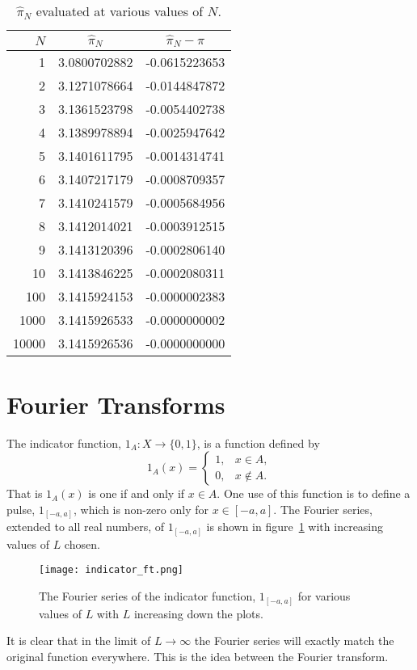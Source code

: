 \documentclass[a4paper]{article}
\begin{document}
    \begin{table}[ht]
        \centering
        \begin{tabular}{rcc}\hline
            \(N\) & \(\hat{\pi}_N\) & \(\hat{\pi}_N - \pi\)\\\hline
            1 & 3.0800702882 & -0.0615223653\\
            2 & 3.1271078664 & -0.0144847872\\
            3 & 3.1361523798 & -0.0054402738\\
            4 & 3.1389978894 & -0.0025947642\\
            5 & 3.1401611795 & -0.0014314741\\
            6 & 3.1407217179 & -0.0008709357\\
            7 & 3.1410241579 & -0.0005684956\\
            8 & 3.1412014021 & -0.0003912515\\
            9 & 3.1413120396 & -0.0002806140\\
            10 & 3.1413846225 & -0.0002080311\\
            100 & 3.1415924153 & -0.0000002383\\
            1000 & 3.1415926533 & -0.0000000002\\
            10000 & 3.1415926536 & -0.0000000000\\\hline
        \end{tabular}
        \caption{\(\hat{\pi}_N\) evaluated at various values of \(N\).}
        \label{tab:pi_N 3}
    \end{table}

    \section{Fourier Transforms}
    The indicator function, \(1_A\colon X\to \{0, 1\}\), is a function defined by
    \[
        1_A(x) = 
        \begin{cases}
            1, & x\in A,\\
            0, & x\notin A.
        \end{cases}
    \]
    That is \(1_A(x)\) is one if and only if \(x\in A\).
    One use of this function is to define a pulse, \(1_{[-a, a]}\), which is non-zero only for \(x\in[-a, a]\).
    The Fourier series, extended to all real numbers, of \(1_{[-a, a]}\) is shown in figure~\ref{fig:indicator} with increasing values of \(L\) chosen.
    \begin{figure}[ht]
        \centering
        \texttt{[image: indicator\_ft.png]}
        \caption{The Fourier series of the indicator function, \(1_{[-a, a]}\) for various values of \(L\) with \(L\) increasing down the plots.}
        \label{fig:indicator}
    \end{figure}
    It is clear that in the limit of \(L\to\infty\) the Fourier series will exactly match the original function everywhere.
    This is the idea between the Fourier transform.
    
\end{document}
